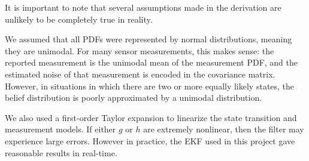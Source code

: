It is important to note that several assumptions made in the derivation are unlikely to be completely true in reality.

We assumed that all PDFs were represented by normal distributions, meaning they are unimodal. For many sensor measurements, this makes sense: the reported measurement is the unimodal mean of the measurement PDF, and the estimated noise of that measurement is encoded in the covariance matrix. However, in situations in which there are two or more equally likely states, the belief distribution is poorly approximated by a unimodal distribution.

We also used a first-order Taylor expansion to linearize the state transition and measurement models. If either \(g\) or \(h\) are extremely nonlinear, then the filter may experience large errors. However in practice, the EKF used in this project gave reasonable results in real-time. 





